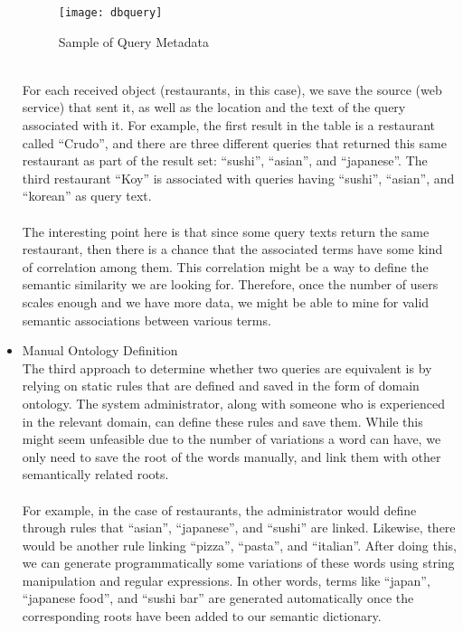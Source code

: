 \begin{itemize}
\begin{figure}[h]
\centering
\texttt{[image: dbquery]}
\caption{Sample of Query Metadata}
\end{figure}
\\
For each received object (restaurants, in this case), we save the source (web service) that sent it, as well as the location and the text of the query associated with it. For example, the first result in the table is a restaurant called ``Crudo'', and there are three different queries that returned this same restaurant as part of the result set: ``sushi'', ``asian'', and ``japanese''. The third restaurant ``Koy'' is associated with queries having ``sushi'', ``asian'', and ``korean'' as query text.\\\\
The interesting point here is that since some query texts return the same restaurant, then there is a chance that the associated terms have some kind of correlation among them. This correlation might be a way to define the semantic similarity we are looking for. Therefore, once the number of users scales enough and we have more data, we might be able to mine for valid semantic associations between various terms.
\pagebreak
\item Manual Ontology Definition\\
The third approach to determine whether two queries are equivalent is by relying on static rules that are defined and saved in the form of domain ontology. The system administrator, along with someone who is experienced in the relevant domain, can define these rules and save them. While this might seem unfeasible due to the number of variations a word can have, we only need to save the root of the words manually, and link them with other semantically related roots.\\\\
For example, in the case of restaurants, the administrator would define through rules that ``asian'', ``japanese'', and ``sushi'' are linked. Likewise, there would be another rule linking ``pizza'', ``pasta'', and ``italian''. After doing this, we can generate programmatically some variations of these words using string manipulation and regular expressions. In other words, terms like ``japan'', ``japanese food'', and ``sushi bar'' are generated automatically once the corresponding roots have been added to our semantic dictionary.\\\\

\end{itemize}

